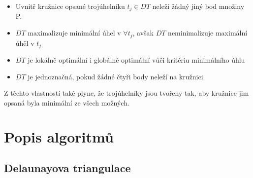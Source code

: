 \documentclass[a4paper, 12pt]{article}
\begin{document}
\begin{itemize}
\item Uvnitř kružnice opsané trojúhelníku $t_j \in DT$ neleží žádný jiný bod množiny P.
\item $DT$ maximalizuje minimální úhel v $\forall t_j$, avšak $DT$ neminimalizuje maximální úhěl v $t_j$

\item $DT$ je lokálně optimální i globálně optimální vůči kritériu minimálního úhlu
\item $DT$ je jednoznačná, pokud žádné čtyři body neleží na kružnici.
\end{itemize}

Z těchto vlastností také plyne, že trojúhelníky jsou tvořeny tak, aby kružnice jim opsaná byla minimální ze všech možných.






\clearpage
\section{Popis algoritmů}

\subsection{Delaunayova triangulace}

\vspace{1.5cm}
\end{document}
